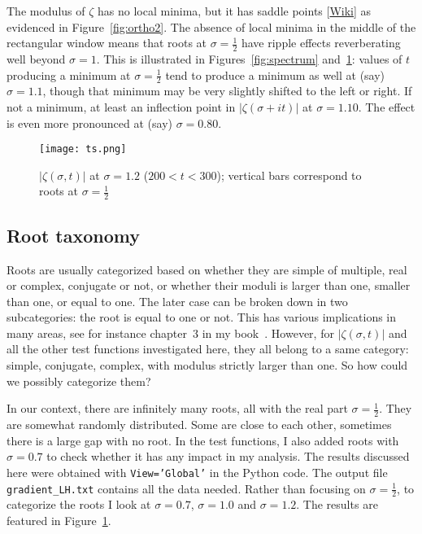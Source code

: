 \documentclass[oneside,10pt]{book}
\begin{document}
The modulus of $\zeta$ has no local minima, but it has
 \textcolor{index}{saddle points} [\href{https://en.wikipedia.org/wiki/Saddle_point}{Wiki}] as evidenced in Figure~\ref{fig:ortho2}. The absence of local minima in the middle of the rectangular window means that roots at $\sigma=\frac{1}{2}$
 have ripple effects reverberating well beyond $\sigma = 1$. This is illustrated in Figures~\ref{fig:spectrum} and~\ref{fig:ts}: values of
 $t$ producing a minimum at $\sigma=\frac{1}{2}$ tend to produce a minimum as well at (say) $\sigma=1.1$, though that minimum
 may be very slightly shifted to the left or right. If not a minimum, at least an inflection point in $|\zeta(\sigma+it)|$ at $\sigma=1.10$. The effect is even more
 pronounced at (say) $\sigma=0.80$.





\begin{figure}%
\centering
\texttt{[image: ts.png]} %
\caption{$|\zeta(\sigma,t)|$  at $\sigma=1.2$ ($200<t<300$); vertical bars correspond to roots at $\sigma=\frac{1}{2}$}
\label{fig:ts}
\end{figure}


\subsection{Root taxonomy}\label{oaqwzx}

Roots are usually categorized based on whether they are simple of multiple, real or complex, conjugate or not, or whether their moduli is larger than one, smaller than one, or equal to one. The later case can be broken down in two subcategories: the root is equal to one or not. This has various implications in many areas, see for instance chapter~3 in my book~\cite{vgelsevier}. However, for
$|\zeta(\sigma,t)|$ and all the other test functions investigated here, they all belong to a same category: simple, conjugate, complex, with modulus strictly larger than one. So how could we possibly categorize them?

In our context, there are infinitely many roots, all with the real part $\sigma = \frac{1}{2}$. They are somewhat randomly distributed. Some are close to each other, sometimes there is a large gap with no root. In the test functions, I also added roots with $\sigma = 0.7$ to check whether it has any impact in my analysis. The results discussed here were obtained with \texttt{View='Global'} in the Python code. The
 output file \texttt{gradient\_LH.txt} contains all the data needed. Rather than focusing on $\sigma=\frac{1}{2}$, to categorize the roots I look at
 $\sigma = 0.7$, $\sigma = 1.0$ and $\sigma =1.2$. The results are featured in Figure~\ref{fig:ts}.
\end{document}
